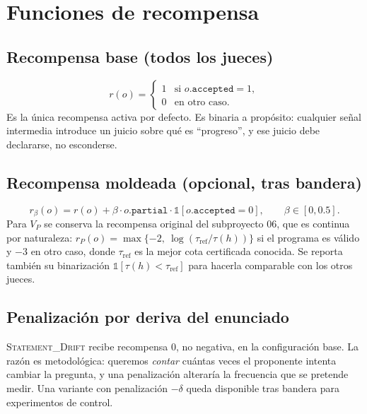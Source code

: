 \documentclass[11pt,a4paper]{article}
\begin{document}
\section{Funciones de recompensa}

\subsection{Recompensa base (todos los jueces)}
\[
  r(o) = \begin{cases} 1 & \text{si } o.\texttt{accepted} = 1,\\ 0 & \text{en otro caso.}\end{cases}
\]
Es la única recompensa activa por defecto. Es binaria a propósito: cualquier señal intermedia introduce un juicio sobre qué es ``progreso'', y ese juicio debe declararse, no esconderse.

\subsection{Recompensa moldeada (opcional, tras bandera)}
\[
  r_\beta(o) = r(o) + \beta \cdot o.\texttt{partial} \cdot \mathbb{1}[o.\texttt{accepted}=0],\qquad \beta \in [0, 0.5].
\]
Para $V_P$ se conserva la recompensa original del subproyecto 06, que es continua por naturaleza: $r_P(o) = \max\{-2,\ \log(\tau_{\mathrm{ref}}/\tau(h))\}$ si el programa es válido y $-3$ en otro caso, donde $\tau_{\mathrm{ref}}$ es la mejor cota certificada conocida. Se reporta también su binarización $\mathbb{1}[\tau(h) < \tau_{\mathrm{ref}}]$ para hacerla comparable con los otros jueces.

\subsection{Penalización por deriva del enunciado}
\textsc{Statement\_Drift} recibe recompensa $0$, no negativa, en la configuración base. La razón es metodológica: queremos \emph{contar} cuántas veces el proponente intenta cambiar la pregunta, y una penalización alteraría la frecuencia que se pretende medir. Una variante con penalización $-\delta$ queda disponible tras bandera para experimentos de control.
\end{document}
